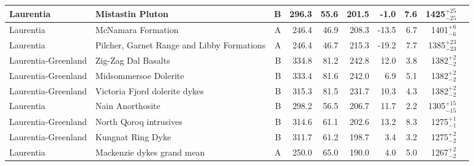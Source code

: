 \begin{longtable}{p{1 in}p{1 in}rrrrrrrp{1.5 in}}
                     Laurentia &                                 Mistastin Pluton &      B &     296.3 &      55.6 & 201.5 &  -1.0 &       7.6 &   1425$^{+25}_{-25}$ &                                 \cite{Fahrig1976a} \\ \hline
                     Laurentia &                               McNamara Formation &      A &     246.4 &      46.9 & 208.3 & -13.5 &       6.7 &     1401$^{+6}_{-6}$ &                                 \cite{Elston2002a} \\ \hline
                     Laurentia &       Pilcher, Garnet Range and Libby Formations &      A &     246.4 &      46.7 & 215.3 & -19.2 &       7.7 &   1385$^{+23}_{-23}$ &                                 \cite{Elston2002a} \\ \hline
           Laurentia-Greenland &                              Zig-Zag Dal Basalts &      B &     334.8 &      81.2 & 242.8 &  12.0 &       3.8 &     1382$^{+2}_{-2}$ &                              \cite{Marcussen1983a} \\ \hline
           Laurentia-Greenland &                            Midsommersoe Dolerite &      B &     333.4 &      81.6 & 242.0 &   6.9 &       5.1 &     1382$^{+2}_{-2}$ &                              \cite{Marcussen1983a} \\ \hline
           Laurentia-Greenland &                    Victoria Fjord dolerite dykes &      B &     315.3 &      81.5 & 231.7 &  10.3 &       4.3 &     1382$^{+2}_{-2}$ &                             \cite{Abrahamsen1987a} \\ \hline
                     Laurentia &                                 Nain Anorthosite &      B &     298.2 &      56.5 & 206.7 &  11.7 &       2.2 &   1305$^{+15}_{-15}$ &                                \cite{Murthy1978a} \\ \hline
           Laurentia-Greenland &                           North Qoroq intrusives &      B &     314.6 &      61.1 & 202.6 &  13.2 &       8.3 &     1275$^{+1}_{-1}$ &                                  \cite{Piper1992a} \\ \hline
           Laurentia-Greenland &                                Kungnat Ring Dyke &      B &     311.7 &      61.2 & 198.7 &   3.4 &       3.2 &     1275$^{+2}_{-2}$ &                                  \cite{Piper1977b} \\ \hline
                     Laurentia &                       Mackenzie dykes grand mean &      A &     250.0 &      65.0 & 190.0 &   4.0 &       5.0 &     1267$^{+2}_{-2}$ &                                 \cite{Buchan2000a} \\ \hline

\end{longtable}

